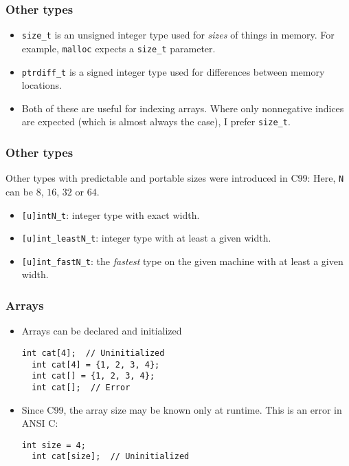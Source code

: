 \begin{frame}
  \frametitle{Other types}
  \begin{itemize}
  \item \texttt{size\_t} is an unsigned integer type used for \emph{sizes} of
    things in memory. For example, \texttt{malloc} expects a \texttt{size\_t}
    parameter.
  \item \texttt{ptrdiff\_t} is a signed integer type used for differences
    between memory locations.
  \item Both of these are useful for indexing arrays. Where only nonnegative
    indices are expected (which is almost always the case), I prefer
    \texttt{size\_t}.
  \end{itemize}
\end{frame}

\begin{frame}
  \frametitle{Other types}
  Other types with predictable and portable sizes were introduced in C99: Here,
  \texttt{N} can be $8$, $16$, $32$ or $64$.
  \begin{itemize}
  \item \texttt{[u]intN\_t}: integer type with exact width.
  \item \texttt{[u]int\_leastN\_t}: integer type with at least a given width.
  \item \texttt{[u]int\_fastN\_t}: the \emph{fastest} type on the given machine
    with at least a given width.
  \end{itemize}
\end{frame}

\begin{frame}[fragile]
  \frametitle{Arrays}
  \begin{itemize}
  \item Arrays can be declared and initialized
\begin{lstlisting}[style=c]
  int cat[4];  // Uninitialized
  int cat[4] = {1, 2, 3, 4};
  int cat[] = {1, 2, 3, 4};
  int cat[];  // Error
\end{lstlisting}
  \item Since C99, the array size may be known only at runtime. This is an error
    in ANSI C:
\begin{lstlisting}[style=c]
  int size = 4;
  int cat[size];  // Uninitialized
\end{lstlisting}
  \end{itemize}
\end{frame}

